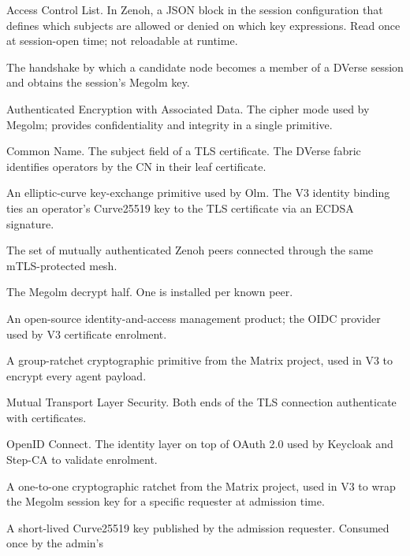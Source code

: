 \documentclass[11pt,a4paper]{article}
\begin{document}
\begin{description}[leftmargin=2.6cm, style=nextline, font=\sffamily\bfseries]
  \item[ACL] Access Control List. In Zenoh, a JSON block in
        the session configuration that defines which subjects
        are allowed or denied on which key expressions. Read
        once at session-open time; not reloadable at runtime.
  \item[admission] The handshake by which a candidate node
        becomes a member of a DVerse session and obtains the
        session's Megolm key.
  \item[AEAD] Authenticated Encryption with Associated Data.
        The cipher mode used by Megolm; provides
        confidentiality and integrity in a single primitive.
  \item[CN] Common Name. The subject field of a TLS
        certificate. The DVerse fabric identifies operators
        by the CN in their leaf certificate.
  \item[Curve25519] An elliptic-curve key-exchange primitive
        used by Olm. The V3 identity binding ties an
        operator's Curve25519 key to the TLS certificate via
        an ECDSA signature.
  \item[fabric] The set of mutually authenticated Zenoh peers
        connected through the same mTLS-protected mesh.
  \item[\texttt{GroupReceiver}] The Megolm decrypt half. One
        is installed per known peer.
  \item[Keycloak] An open-source identity-and-access
        management product; the OIDC provider used by V3
        certificate enrolment.
  \item[Megolm] A group-ratchet cryptographic primitive from
        the Matrix project, used in V3 to encrypt every agent
        payload.
  \item[mTLS] Mutual Transport Layer Security. Both ends of
        the TLS connection authenticate with certificates.
  \item[OIDC] OpenID Connect. The identity layer on top of
        OAuth 2.0 used by Keycloak and Step-CA to validate
        enrolment.
  \item[Olm] A one-to-one cryptographic ratchet from the
        Matrix project, used in V3 to wrap the Megolm
        session key for a specific requester at admission
        time.
  \item[prekey] A short-lived Curve25519 key published by the
        admission requester. Consumed once by the admin's

\end{description}
\end{document}
